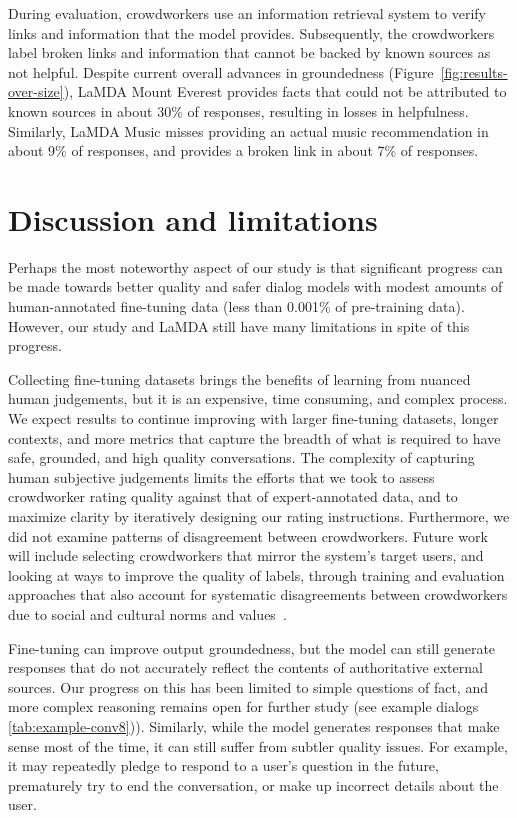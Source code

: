 During evaluation, crowdworkers use an information retrieval system to verify links and information that the model provides. Subsequently, the crowdworkers label broken links and information that cannot be backed by known sources as not helpful. Despite current overall advances in groundedness (Figure~\ref{fig:results-over-size}), LaMDA Mount Everest provides facts that could not be attributed to known sources in about 30\% of responses, resulting in losses in helpfulness. Similarly, LaMDA Music misses providing an actual music recommendation in about 9\% of responses, and provides a broken link in about 7\% of responses. 

\FloatBarrier

\section{Discussion and limitations}

Perhaps the most noteworthy aspect of our study is that significant progress can be made towards better quality and safer dialog models with modest amounts of human-annotated fine-tuning data (less than 0.001\% of pre-training data). However, our study and LaMDA still have many limitations in spite of this progress.

Collecting fine-tuning datasets brings the benefits of learning from nuanced human judgements, but it is an expensive, time consuming, and complex process. We expect results to continue improving with larger fine-tuning datasets, longer contexts, and more metrics that capture the breadth of what is required to have safe, grounded, and high quality conversations. The complexity of capturing human subjective judgements limits the efforts that we took to assess crowdworker rating quality against that of expert-annotated data, and to maximize clarity by iteratively designing our rating instructions. Furthermore, we did not examine patterns of disagreement between crowdworkers. Future work will include selecting crowdworkers that mirror the system's target users, and looking at ways to improve the quality of labels, through training and evaluation approaches that also account for systematic disagreements between crowdworkers due to social and cultural norms and values~\cite{Aroyo_Welty_2015}.

Fine-tuning can improve output groundedness, but the model can still generate responses that do not accurately reflect the contents of authoritative external sources. Our progress on this has been limited to simple questions of fact, and more complex reasoning remains open for further study (see example dialogs \ref{tab:example-conv8})). Similarly, while the model generates responses that make sense most of the time, it can still suffer from subtler quality issues. For example, it may repeatedly pledge to respond to a user’s question in the future, prematurely try to end the conversation, or make up incorrect details about the user.

